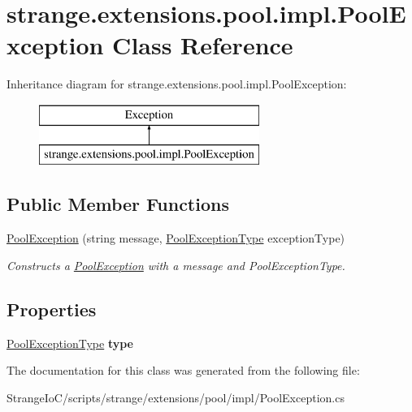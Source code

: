 \hypertarget{classstrange_1_1extensions_1_1pool_1_1impl_1_1_pool_exception}{\section{strange.\-extensions.\-pool.\-impl.\-Pool\-Exception Class Reference}
\label{classstrange_1_1extensions_1_1pool_1_1impl_1_1_pool_exception}
}
Inheritance diagram for strange.\-extensions.\-pool.\-impl.\-Pool\-Exception\-:\begin{figure}[H]
\begin{center}
\leavevmode
\includegraphics[height=2.000000cm]{classstrange_1_1extensions_1_1pool_1_1impl_1_1_pool_exception}
\end{center}
\end{figure}
\subsection*{Public Member Functions}
\begin{DoxyCompactItemize}
\item 
\hypertarget{classstrange_1_1extensions_1_1pool_1_1impl_1_1_pool_exception_ab96991592f1db90788037b3da3d37886}{\hyperlink{classstrange_1_1extensions_1_1pool_1_1impl_1_1_pool_exception_ab96991592f1db90788037b3da3d37886}{Pool\-Exception} (string message, \hyperlink{namespacestrange_1_1extensions_1_1pool_1_1api_a93ccdd4d6e731ba8a31a774428edec32}{Pool\-Exception\-Type} exception\-Type)}\label{classstrange_1_1extensions_1_1pool_1_1impl_1_1_pool_exception_ab96991592f1db90788037b3da3d37886}

\begin{DoxyCompactList}\small\item\em Constructs a \hyperlink{classstrange_1_1extensions_1_1pool_1_1impl_1_1_pool_exception}{Pool\-Exception} with a message and Pool\-Exception\-Type. \end{DoxyCompactList}\end{DoxyCompactItemize}
\subsection*{Properties}
\begin{DoxyCompactItemize}
\item 
\hypertarget{classstrange_1_1extensions_1_1pool_1_1impl_1_1_pool_exception_ac55555c472ffe36aa2be9a641051391d}{\hyperlink{namespacestrange_1_1extensions_1_1pool_1_1api_a93ccdd4d6e731ba8a31a774428edec32}{Pool\-Exception\-Type} {\bfseries type}}\label{classstrange_1_1extensions_1_1pool_1_1impl_1_1_pool_exception_ac55555c472ffe36aa2be9a641051391d}

\end{DoxyCompactItemize}


The documentation for this class was generated from the following file\-:\begin{DoxyCompactItemize}
\item 
Strange\-Io\-C/scripts/strange/extensions/pool/impl/Pool\-Exception.\-cs\end{DoxyCompactItemize}
